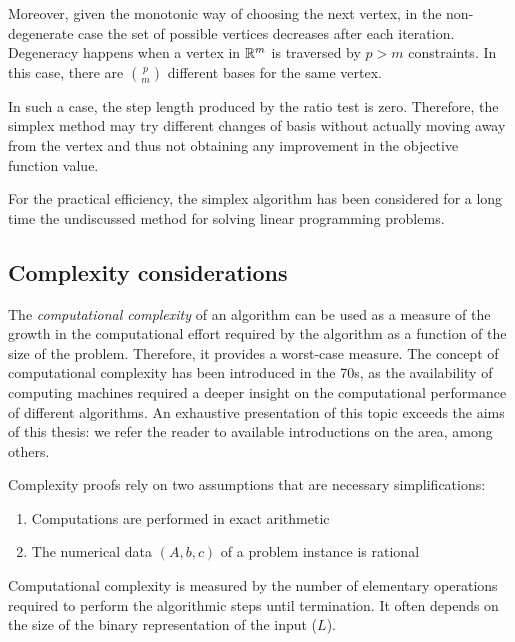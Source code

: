 Moreover, given the monotonic
way of choosing the next vertex, in the non-degenerate case the set 
of possible vertices decreases after each iteration. Degeneracy
happens when a vertex in $\mathbb{R}^m$ is traversed by $p > m$ constraints.
In this case, there are $\binom{p}{m}$ different bases for the same
vertex. 

In such a case, the step length produced by the ratio test
is zero. Therefore, the simplex method
may try different changes of basis without actually moving away
from the vertex and thus not obtaining any improvement in the objective
function value.


For the practical efficiency, the simplex algorithm has been considered
for a long time the undiscussed method for solving linear programming
problems.


%
%
\subsection{Complexity considerations}
\label{sec:ComplexityConsiderations}

The {\em computational complexity} of an algorithm can be used as a measure
of the growth in the computational effort required by the algorithm
as a function of the size of the problem. Therefore, it provides 
a worst-case measure.
The concept of computational complexity has been introduced in the 70s,
as the availability of computing machines required a deeper insight
on the computational performance of different algorithms.
An exhaustive presentation of this topic exceeds the aims of this thesis:
we refer the reader to available introductions on the area, 
\cite[ch.~2]{Schrijver86} among others.

Complexity proofs rely on two assumptions that are necessary 
simplifications:
\begin{enumerate}
\item Computations are performed in exact arithmetic
\item The numerical data $(A, b, c)$ of a problem instance is rational
\end{enumerate}

Computational complexity is measured by the number of elementary operations
required to perform the algorithmic steps until termination. It often depends 
on the size of the binary representation of the input ($L$).

